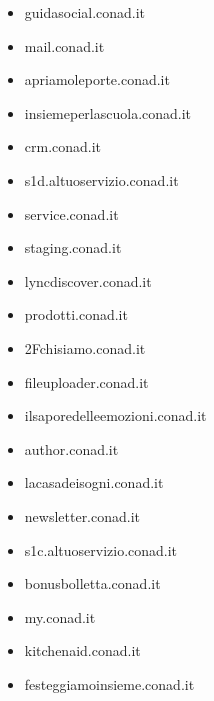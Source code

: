 \documentclass{article}
\begin{document}
\begin{itemize}
            \item guidasocial.conad.it
        
            \item mail.conad.it
        
            \item apriamoleporte.conad.it
        
            \item insiemeperlascuola.conad.it
        
            \item crm.conad.it
        
            \item s1d.altuoservizio.conad.it
        
            \item service.conad.it
        
            \item staging.conad.it
        
            \item lyncdiscover.conad.it
        
            \item prodotti.conad.it
        
            \item 2Fchisiamo.conad.it
        
            \item fileuploader.conad.it
        
            \item ilsaporedelleemozioni.conad.it
        
            \item author.conad.it
        
            \item lacasadeisogni.conad.it
        
            \item newsletter.conad.it
        
            \item s1c.altuoservizio.conad.it
        
            \item bonusbolletta.conad.it
        
            \item my.conad.it
        
            \item kitchenaid.conad.it
        
            \item festeggiamoinsieme.conad.it
        

\end{itemize}
\end{document}

